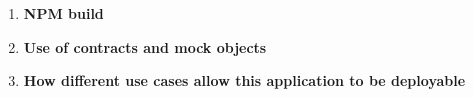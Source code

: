 \begin{enumerate}
\item \textbf{NPM build}
\item \textbf{Use of contracts and mock objects}
\item \textbf{How different use cases allow this application to be deployable}
\end{enumerate}
